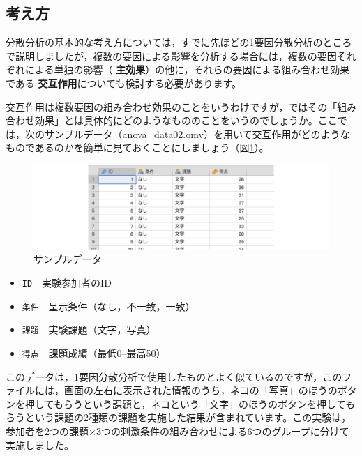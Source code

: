 \documentclass[
  12pt,
  a5jpaper,
  lualatex, ja=standard]{bxjsbook}
\providecommand{\tightlist}{%
  \setlength{\itemsep}{0pt}\setlength{\parskip}{0pt}}
\renewcommand{\emph}[1]{\textbf{\color{emph} #1}}
\newenvironment{jmvvar}{%
	\begin{center}%
	\begin{tcolorbox}[%
		title=変数一覧,
		colframe=daidai,
		colbacktitle=daidai!30!white,
		coltitle=daidai!10!black,
		colback=daidai!2!white,
		breakable,
		width=.9\textwidth
		]\small\addtolength{\leftmargini}{-3\labelsep}%
	}%
	{\end{tcolorbox}\end{center}}
\begin{document}
\hypertarget{sub:ANOVA-anova-basics}{%
\subsection{考え方}\label{sub:ANOVA-anova-basics}}

分散分析の基本的な考え方については，すでに先ほどの1要因分散分析のところで説明しましたが，複数の要因による影響を分析する場合には，複数の要因それぞれによる単独の影響（\emph{主効果}）の他に，それらの要因による組み合わせ効果である\emph{交互作用}についても検討する必要があります。

交互作用は複数要因の組み合わせ効果のことをいうわけですが，ではその「組み合わせ効果」とは具体的にどのようなもののことをいうのでしょうか。ここでは，次のサンプルデータ（\href{https://github.com/sbtseiji/jmv_compguide/raw/main/data/omv/anova_data02.omv}{anova\_data02.omv}）を用いて交互作用がどのようなものであるのかを簡単に見ておくことにしましょう（図\ref{fig:ANOVA-data02}）。

\begin{figure}[!ht]

{\centering \includegraphics[width=1\linewidth]{images/ANOVA/data02} 

}

\caption{サンプルデータ}\label{fig:ANOVA-data02}
\end{figure}

\begin{jmvvar}

\begin{itemize}
\tightlist
\item
  \texttt{ID}　実験参加者のID
\item
  \texttt{条件}　呈示条件（なし，不一致，一致）
\item
  \texttt{課題}　実験課題（文字，写真）
\item
  \texttt{得点}　課題成績（最低0--最高50）
\end{itemize}

\end{jmvvar}

このデータは，1要因分散分析で使用したものとよく似ているのですが，このファイルには，画面の左右に表示された情報のうち，ネコの「写真」のほうのボタンを押してもらうという課題と，ネコという「文字」のほうのボタンを押してもらうという課題の2種類の課題を実施した結果が含まれています。この実験は，参加者を2つの課題×3つの刺激条件の組み合わせによる6つのグループに分けて実施しました。
\end{document}
